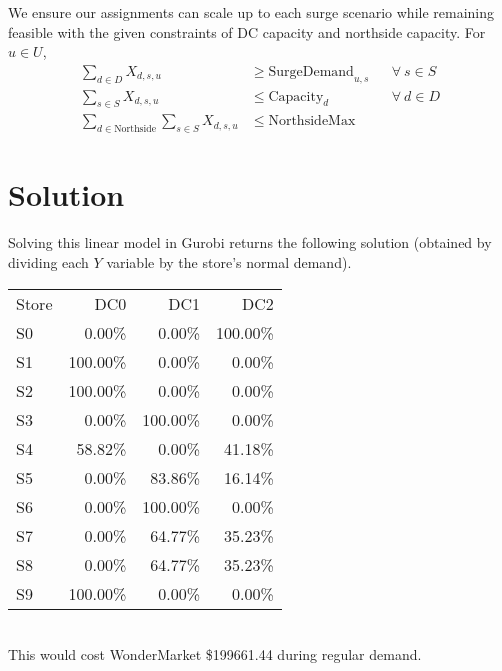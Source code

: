 \documentclass[11pt,a4paper]{article}
\begin{document}
We ensure our assignments can scale up to each surge scenario while remaining 
feasible with the given constraints of DC capacity and northside capacity. For $u \in U$,
\begin{align*}
    \sum_{d \in D} X_{d,s,u} &\ge \mathrm{SurgeDemand}_{u,s} &&\forall~s \in S \\ 
    \sum_{s \in S} X_{d,s,u} &\le \mathrm{Capacity}_d &&\forall~d \in D \\ 
    \sum_{d \in \mathrm{Northside}} \sum_{s \in S} X_{d,s,u} &\le \mathrm{NorthsideMax}
\end{align*}

\pagebreak
\part{Solution}
Solving this linear model in Gurobi returns the following solution (obtained by dividing 
each $Y$ variable by the store's normal demand).\\[1em]
\begin{tabular}{l  r  r  r }
    Store & DC0 & DC1 & DC2 \\ 
S0 & 0.00\% & 0.00\% & 100.00\% \\
S1 & 100.00\% & 0.00\% & 0.00\% \\
S2 & 100.00\% & 0.00\% & 0.00\% \\
S3 & 0.00\% & 100.00\% & 0.00\% \\
S4 & 58.82\% & 0.00\% & 41.18\% \\
S5 & 0.00\% & 83.86\% & 16.14\% \\
S6 & 0.00\% & 100.00\% & 0.00\% \\
S7 & 0.00\% & 64.77\% & 35.23\% \\
S8 & 0.00\% & 64.77\% & 35.23\% \\
S9 & 100.00\% & 0.00\% & 0.00\% \\ 
\end{tabular}\\[1em]
This would cost WonderMarket \$199661.44 during regular demand.
\end{document}

